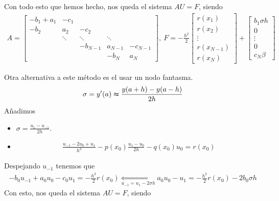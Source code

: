 Con todo esto que hemos hecho, nos queda el sistema $AU = F$, siendo
\begin{align*}
     A = \begin{bmatrix}
-b_1 +a_1 & -c_1 &  &  & \\
-b_2 & a_2 & -c_2 &  & \\
 & \ddots & \ddots & \ddots & \\
 &  & -b_{N-1} & a_{N-1} & -c_{N-1} \\
 &  &  & -b_N & a_N
\end{bmatrix}, \ F = -\frac{h^2}{2} \begin{bmatrix}
r(x_1)\\
r(x_2) \\
\vdots\\
r(x_{N-1}) \\
r(x_N)
\end{bmatrix} + \begin{bmatrix}
b_1 \sigma h\\
0 \\
\vdots\\
0 \\
c_N\beta
\end{bmatrix}
\end{align*}

Otra alternativa a este método es el usar un nodo fantasma.
\begin{align*}
    \sigma = y'(a) \thickapprox \frac{y(a+h) -y(a-h)}{2h}
\end{align*}
Añadimos
\begin{itemize}
    \item $\sigma = \frac{u_1 -u_{-1}}{2h}$.
    \item
    \begin{align*}
        \frac{u_{-1} -2u_0 +u_1}{h^2} - p(x_0)\frac{u_1 -u_0}{2h} -q(x_0)u_0 = r(x_0)
    \end{align*}
\end{itemize}
Despejando $u_{-1}$ tenemos que
\begin{align*}
    -b_0u_{-1} +a_0u_0 -c_0u_1 = -\frac{h^2}{2}r(x_0) \underset{u_{-1} = u_1 - 2\sigma h}{\Longleftrightarrow} a_0u_0 -u_1 = -\frac{h^2}{2}r(x_0) -2b_0\sigma h
\end{align*}
Con esto, nos queda el sistema $AU = F$, siendo

